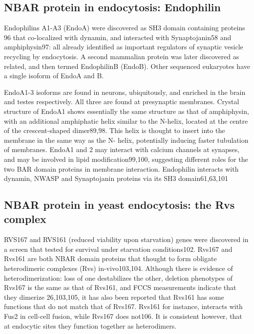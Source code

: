 	\subsection{NBAR protein in endocytosis: Endophilin }	
	Endophilins A1-A3 (EndoA) were discovered as SH3 domain containing proteins 96 that co-localized with dynamin, and interacted with Synaptojanin58 and amphiphysin97: all already identified as important regulators of synaptic vesicle recycling by endocytosis. A second mammalian protein was later discovered as related, and then termed EndophilinB (EndoB). Other sequenced eukaryotes have a single isoform of EndoA and B.

	\vspace{5mm}
	EndoA1-3 isoforms are found in neurons, ubiquitously, and enriched in the brain and testes respectively. All three are found at presynaptic membranes. Crystal structure of EndoA1 shows essentially the same structure as that of amphiphysin, with an additional amphiphatic helix similar to the N-helix, located at the centre of the crescent-shaped dimer89,98. This helix is thought to insert into the membrane in the same way as the N- helix, potentially inducing faster tubulation of membranes. EndoA1 and 2 may interact with calcium channels at synapses, and may be involved in lipid modification99,100, suggesting different roles for the two BAR domain proteins in membrane interaction. Endophilin interacts with dynamin, NWASP and Synaptojanin proteins via its SH3 domain61,63,101



	\subsection{NBAR protein in yeast endocytosis: the Rvs complex}		
	RVS167 and RVS161 (reduced viability upon starvation) genes were discovered in a screen that tested for survival under starvation conditions102. Rvs167 and Rvs161 are both NBAR domain proteins that thought to form obligate heterodimeric complexes (Rvs) in-vivo103,104. Although there is evidence of heterodimerization: loss of one destabilizes the other, deletion phenotypes of Rvs167 is the same as that of Rvs161, and FCCS measurements indicate that they dimerize 26,103,105, it has also been reported that Rvs161 has some functions that do not match that of Rvs167. Rvs161 for instance, interacts with Fus2 in cell-cell fusion, while Rvs167 does not106. It is consistent however, that at endocytic sites they function together as heterodimers. 

